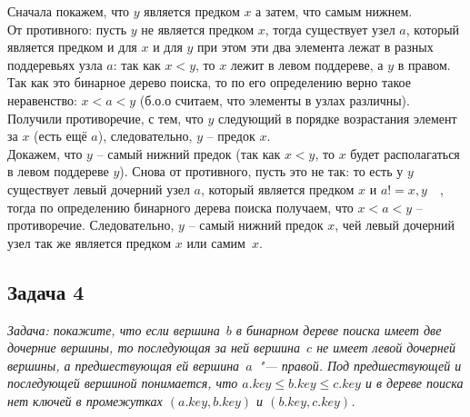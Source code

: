 \documentclass[a4paper,12pt]{article} %
\begin{document}
Сначала покажем, что $ y $ является предком $ x $ а затем, что самым нижнем.\\
От противного: пусть $ y $ не является предком $ x $, тогда существует узел $ a $, который является предком и для $ x $ и для $ y $ при этом эти два элемента лежат в разных поддеревьях узла $ a $: так как $ x < y $, то $ x $ лежит в левом поддереве, а $ y $ в правом. Так как это бинарное дерево поиска, то по его определению верно такое неравенство: $ x < a < y $ (б.о.о считаем, что элементы в узлах различны). Получили противоречие, с тем, что $ y $ следующий в порядке возрастания элемент за $ x $ (есть ещё $ a $), следовательно, $ y $ -- предок $ x $.\\

Докажем, что $ y $ -- самый нижний предок (так как $ x < y $, то $ x $ будет располагаться в левом поддереве $ y $). Снова от противного, пусть это не так: то есть у $ y $ существует левый дочерний узел $ a $, который является предком $ x $ и $ a  != x, y \quad $, тогда по определению бинарного дерева поиска получаем, что $ x < a < y $ -- противоречие. Следовательно, $ y $ -- самый нижний предок $x$, чей левый дочерний узел так же является предком $x$ или самим~$x$.


\subsection*{Задача 4}
\textit{Задача: покажите, что если вершина~$b$ в бинарном дереве поиска имеет две дочерние вершины, то последующая за ней вершина~$c$ не имеет левой дочерней вершины, а предшествующая ей вершина~$a$~"--- правой. Под предшествующей и последующей вершиной понимается, что $a.key \leq b.key \leq c.key$ и в дереве поиска нет ключей в промежутках $(a.key,b.key)$ и $(b.key,c.key)$.}\\
\end{document}
